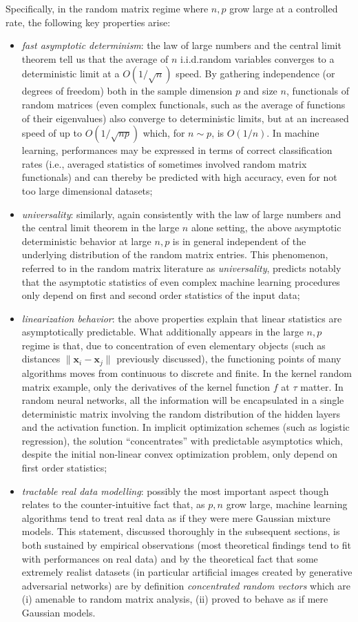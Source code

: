 \documentclass[MAL,biber]{nowfnt} %
\newcommand{\x}{{\mathbf{x}}}
\begin{document}
Specifically, in the random matrix regime where $n,p$ grow large at a controlled rate, the following key properties arise:
\begin{itemize}
    \item \emph{fast asymptotic determinism}: the law of large numbers and the central limit theorem tell us that the average of $n$ i.i.d.\@ random variables converges to a deterministic limit at a $O(1/\sqrt{n})$ speed. By gathering independence (or degrees of freedom) both in the sample dimension $p$ and size $n$, functionals of random matrices (even complex functionals, such as the average of functions of their eigenvalues) also converge to deterministic limits, but at an increased speed of up to $O(1/\sqrt{np})$ which, for $n\sim p$, is $O(1/n)$. In machine learning, performances may be expressed in terms of correct classification rates (i.e., averaged statistics of sometimes involved random matrix functionals) and can thereby be predicted with high accuracy, even for not too large dimensional datasets;
    \item \emph{universality}: similarly, again consistently with the law of large numbers and the central limit theorem in the large $n$ alone setting, the above asymptotic deterministic behavior at large $n,p$ is in general independent of the underlying distribution of the random matrix entries. This phenomenon, referred to in the random matrix literature as \emph{universality}, predicts notably that the asymptotic statistics of even complex machine learning procedures only depend on first and second order statistics of the input data;
    \item \emph{linearization behavior}: the above properties explain that linear statistics are asymptotically predictable. What additionally appears in the large $n,p$ regime is that, due to concentration of even elementary objects (such as distances $\|\x_i-\x_j\|$ previously discussed), the functioning points of many algorithms moves from continuous to discrete and finite. In the kernel random matrix example, only the derivatives of the kernel function $f$ at $\tau$ matter. In random neural networks, all the information will be encapsulated in a single deterministic matrix involving the random distribution of the hidden layers and the activation function. In implicit optimization schemes (such as logistic regression), the solution ``concentrates'' with predictable asymptotics which, despite the initial non-linear convex optimization problem, only depend on first order statistics;
    \item \emph{tractable real data modelling}: possibly the most important aspect though relates to the counter-intuitive fact that, as $p,n$ grow large, machine learning algorithms tend to treat real data as if they were mere Gaussian mixture models. This statement, discussed thoroughly in the subsequent sections, is both sustained by empirical observations (most theoretical findings tend to fit with performances on real data) and by the theoretical fact that some extremely realist datasets (in particular artificial images created by generative adversarial networks) are by definition \emph{concentrated random vectors} which are (i) amenable to random matrix analysis, (ii) proved to behave as if mere Gaussian models.
\end{itemize}
\end{document}
